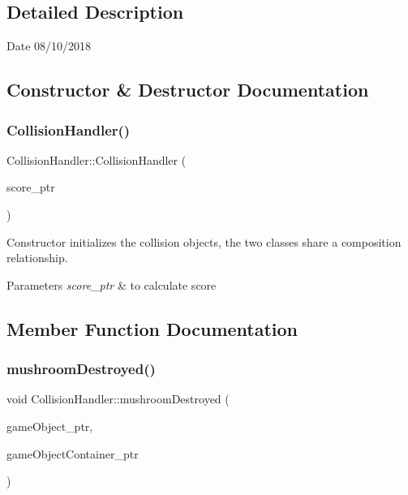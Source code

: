 \subsection{Detailed Description}
\begin{DoxyDate}{Date}
08/10/2018 
\end{DoxyDate}


\subsection{Constructor \& Destructor Documentation}
\mbox{\label{class_collision_handler_ad7e987b02f093a6c060b3b9396a323ce}} 
\subsubsection{\texorpdfstring{Collision\+Handler()}{CollisionHandler()}}
{\footnotesize\ttfamily Collision\+Handler\+::\+Collision\+Handler (\begin{DoxyParamCaption}\item[{shared\+\_\+ptr$<$ \mbox{\hyperlink{class_score}{Score}} $>$}]{score\+\_\+ptr }\end{DoxyParamCaption})\hspace{0.3cm}{\ttfamily [inline]}}



Constructor initializes the collision objects, the two classes share a composition relationship. 


\begin{DoxyParams}{Parameters}
{\em score\+\_\+ptr} & to calculate score \\
\hline
\end{DoxyParams}


\subsection{Member Function Documentation}
\mbox{\label{class_collision_handler_a314663c4aa7a14e7b935794796e6e7c5}} 
\subsubsection{\texorpdfstring{mushroom\+Destroyed()}{mushroomDestroyed()}}
{\footnotesize\ttfamily void Collision\+Handler\+::mushroom\+Destroyed (\begin{DoxyParamCaption}\item[{shared\+\_\+ptr$<$ \mbox{\hyperlink{class_game_object}{Game\+Object}} $>$}]{game\+Object\+\_\+ptr,  }\item[{shared\+\_\+ptr$<$ \mbox{\hyperlink{class_game_object_container}{Game\+Object\+Container}} $>$}]{game\+Object\+Container\+\_\+ptr }\end{DoxyParamCaption})}



